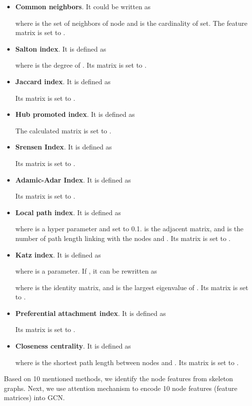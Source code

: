 \documentclass[journal]{IEEEtran}
\begin{document}
\begin{itemize}

    \item \textbf{Common neighbors}. It could be written as
        
        where  is the set of neighbors of node  and  is the cardinality of set. The feature matrix is set to .
    \item \textbf{Salton index}. It is defined as
        
        where  is the degree of . Its matrix is set to .
    \item \textbf{Jaccard index}. It is defined as
        
        Its matrix is set to .
    \item \textbf{Hub promoted index}. It is defined as
        
        The calculated matrix is set to .
    \item \textbf{Srensen Index}. It is defined as
        
        Its matrix is set to .
    \item \textbf{Adamic-Adar Index}. It is defined as
        
        Its matrix is set to .
    \item \textbf{Local path index}. It is defined as
        
        where  is a hyper parameter and set to 0.1.  is the adjacent matrix, and  is the number of path length  linking with the nodes  and . Its matrix is set to .
        \item \textbf{Katz index}. It is defined as
        
        where  is a parameter. If , it can be rewritten as
        
        where  is the identity matrix, and  is the largest eigenvalue of . Its matrix is set to .
        \item \textbf{Preferential attachment index}. It is defined as
        
        Its matrix is set to .
        \item \textbf{Closeness centrality}. It is defined as
        
        where  is the shortest path length between nodes  and . Its matrix is set to .

\end{itemize}

Based on 10 mentioned methods, we identify the node features from skeleton graphs. Next, we use attention mechanism to encode 10 node features (feature matrices) into GCN.
\end{document}
